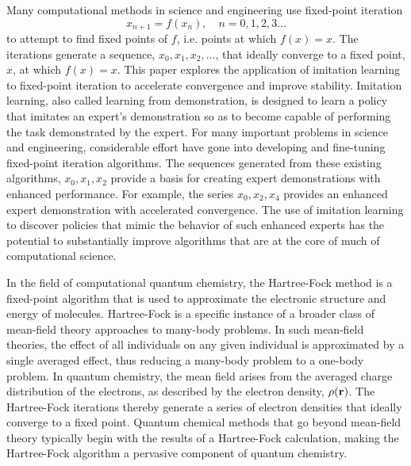 \documentclass[twoside,11pt]{article}
\begin{document}
Many computational methods in science and engineering use fixed-point iteration
\[
x_{n+1} = f(x_n), \quad n = 0,1,2,3...
\]
to attempt to find fixed points of $f$, i.e. points at which $f(x)=x$. The iterations generate a sequence, $x_0, x_1, x_2, \ldots$, that ideally converge to a fixed point, $x$, at which $f(x)=x$. This paper explores the application of imitation learning to fixed-point iteration to accelerate convergence and improve stability. Imitation learning, also called learning from demonstration, is designed to learn a policy that imitates an expert's demonstration so as to become capable of performing the task demonstrated by the expert. For many important problems in science and engineering, considerable effort have gone into developing and fine-tuning fixed-point iteration algorithms. The sequences generated from these existing algorithms, $x_0, x_1, x_2$  provide a basis for creating expert demonstrations with enhanced performance. For example, the series $x_0, x_2, x_4$ provides an enhanced expert demonstration with accelerated convergence. The use of imitation learning to discover policies that mimic the behavior of such enhanced experts has the potential to substantially improve algorithms that are at the core of much of computational science.

In the field of computational quantum chemistry, the Hartree-Fock method is a fixed-point algorithm that is used to approximate the electronic structure and energy of molecules. Hartree-Fock is a specific instance of a broader class of mean-field theory approaches to many-body problems. In such mean-field theories, the effect of all individuals on any given individual is approximated by a single averaged effect, thus reducing a many-body problem to a one-body problem. In quantum chemistry, the mean field arises from the averaged charge distribution of the electrons, as described by the electron density, $\rho({\bf r})$. The Hartree-Fock iterations thereby generate a series of electron densities that ideally converge to a fixed point. Quantum chemical methods that go beyond mean-field theory typically begin with the results of a Hartree-Fock calculation, making the Hartree-Fock algorithm a pervasive component of quantum chemistry.\cite{Some authoritative review of electronic-structure theory}
\end{document}
